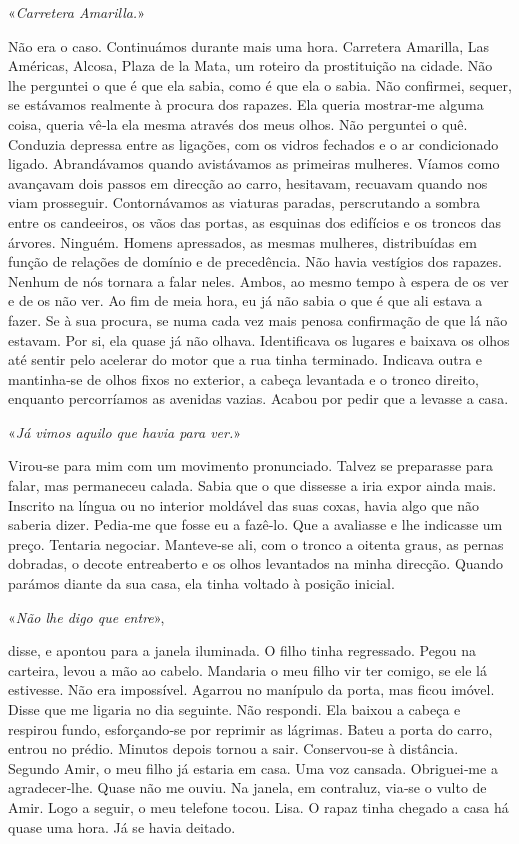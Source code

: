 «\emph{Carretera Amarilla.}»

Não era o caso. Continuámos durante mais uma hora. Carretera Amarilla,
Las Américas, Alcosa, Plaza de la Mata, um roteiro da prostituição na
cidade. Não lhe perguntei o que é que ela sabia, como é que ela o sabia.
Não confirmei, sequer, se estávamos realmente à procura dos rapazes. Ela
queria mostrar­‑me alguma coisa, queria vê­‑la ela mesma através dos
meus olhos. Não perguntei o quê. Conduzia depressa entre as ligações,
com os vidros fechados e o ar condicionado ligado. Abrandávamos quando
avistávamos as primeiras mulheres. Víamos como avançavam dois passos em
direcção ao carro, hesitavam, recuavam quando nos viam prosseguir.
Contornávamos as viaturas paradas, perscrutando a sombra entre os
candeeiros, os vãos das portas, as esquinas dos edifícios e os troncos
das árvores. Ninguém. Homens apressados, as mesmas mulheres,
distribuídas em função de relações de domínio e de precedência. Não
havia vestígios dos rapazes. Nenhum de nós tornara a falar neles. Ambos,
ao mesmo tempo à espera de os ver e de os não ver. Ao fim de meia hora,
eu já não sabia o que é que ali estava a fazer. Se à sua procura, se
numa cada vez mais penosa confirmação de que lá não estavam. Por si, ela
quase já não olhava. Identificava os lugares e baixava os olhos até
sentir pelo acelerar do motor que a rua tinha terminado. Indicava outra
e mantinha­‑se de olhos fixos no exterior, a cabeça levantada e o tronco
direito, enquanto percorríamos as avenidas vazias. Acabou por pedir que
a levasse a casa.

«\emph{Já vimos aquilo que havia para ver.}»

Virou­‑se para mim com um movimento pronunciado. Talvez se preparasse
para falar, mas permaneceu calada. Sabia que o que dissesse a iria expor
ainda mais. Inscrito na língua ou no interior moldável das suas coxas,
havia algo que não saberia dizer. Pedia­‑me que fosse eu a fazê­‑lo. Que
a avaliasse e lhe indicasse um preço. Tentaria negociar. Manteve­‑se
ali, com o tronco a oitenta graus, as pernas dobradas, o decote
entreaberto e os olhos levantados na minha direcção. Quando parámos
diante da sua casa, ela tinha voltado à posição inicial.

«\emph{Não lhe digo que entre}»,

disse, e apontou para a janela iluminada. O filho tinha regressado.
Pegou na carteira, levou a mão ao cabelo. Mandaria o meu filho vir ter
comigo, se ele lá estivesse. Não era impossível. Agarrou no manípulo da
porta, mas ficou imóvel. Disse que me ligaria no dia seguinte. Não
respondi. Ela baixou a cabeça e respirou fundo, esforçando­‑se por
reprimir as lágrimas. Bateu a porta do carro, entrou no prédio. Minutos
depois tornou a sair. Conservou­‑se à distância. Segundo Amir, o meu
filho já estaria em casa. Uma voz cansada. Obriguei­‑me a
agradecer­‑lhe. Quase não me ouviu. Na janela, em contraluz, via­‑se o
vulto de Amir. Logo a seguir, o meu telefone tocou. Lisa. O rapaz tinha
chegado a casa há quase uma hora. Já se havia deitado.

